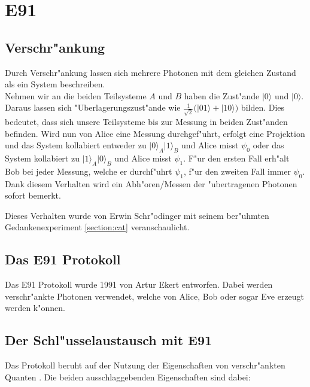 \newcommand{\qcste}{$-22.5^{\circ}$}
\newcommand{\qcstz}{$0^{\circ}$}
\newcommand{\qcstd}{$22.5^{\circ}$}
\newcommand{\qcstv}{$45^{\circ}$}

\section{E91}
  \subsection{Verschr"ankung}
  Durch Verschr"ankung lassen sich mehrere Photonen mit dem gleichen Zustand als ein System beschreiben.\\
  Nehmen wir an die beiden Teilsysteme $A$ und $B$ haben die Zust"ande $|0\rangle$ und $|0\rangle$. Daraus
  lassen sich "Uberlagerungszust"ande wie $\frac{1}{\sqrt{2}}\big(|01\rangle + |10\rangle\big)$ bilden. Dies bedeutet, dass sich unsere
  Teilsysteme bis zur Messung in beiden Zust"anden befinden.
  Wird nun von Alice eine Messung durchgef"uhrt, erfolgt eine Projektion und
  das System kollabiert entweder zu $\lvert0\rangle_A|1\rangle_B$ und Alice misst $\psi_0$ oder
  das System kollabiert zu $\lvert1\rangle_A|0\rangle_B$ und Alice misst $\psi_1$.
  F"ur den ersten Fall erh"alt Bob bei jeder Messung,
  welche er durchf"uhrt $\psi_1$, f"ur den zweiten Fall immer $\psi_0$.
  Dank diesem Verhalten wird ein Abh"oren/Messen der "ubertragenen Photonen sofort bemerkt.

  Dieses Verhalten wurde von Erwin Schr"odinger mit seinem
  ber"uhmten Gedankenexperiment \ref{section:cat} veranschaulicht.

  \subsection{Das E91 Protokoll}
  Das E91 Protokoll wurde 1991 von Artur Ekert entworfen.
  Dabei werden verschr"ankte Photonen verwendet, welche von Alice, Bob oder sogar Eve erzeugt werden k"onnen.

  \subsection{Der Schl"usselaustausch mit E91}
  Das Protokoll beruht auf der Nutzung der Eigenschaften von verschr"ankten Quanten \cite{qc:verschraenkung}.
  Die beiden ausschlaggebenden Eigenschaften sind dabei:

